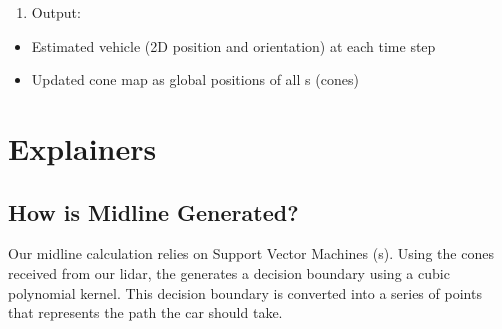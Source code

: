 \documentclass[letterpaper,10pt,english]{sphinxmanual}
\begin{document}
\begin{enumerate}
%
\setcounter{enumi}{2}
\item {} 
\sphinxAtStartPar
Output:

\end{enumerate}
\begin{itemize}
\item {} 
\sphinxAtStartPar
Estimated vehicle {\hyperref[\detokenize{glossary:term-Pose}]{}} (2D position and orientation) at each time step

\item {} 
\sphinxAtStartPar
Updated cone map as global positions of all {\hyperref[\detokenize{glossary:term-Landmark}]{}}s (cones)

\end{itemize}

\sphinxstepscope


\section{Explainers}
\label{\detokenize{explainers:explainers}}\label{\detokenize{explainers::doc}}

\subsection{How is Midline Generated?}
\label{\detokenize{explainers:how-is-midline-generated}}
\sphinxAtStartPar
Our midline calculation relies on Support Vector Machines ({\hyperref[\detokenize{glossary:term-SVM}]{}}s). Using the cones received from our lidar, the {\hyperref[\detokenize{glossary:term-SVM}]{}} generates a decision boundary using a cubic polynomial kernel. This decision boundary is converted into a series of points that represents the path the car should take.
\end{document}
